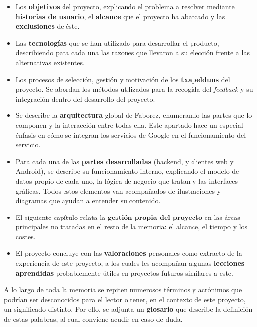 \documentclass[main]{subfiles}
\begin{document}
\begin{itemize}
    \item Los \textbf{objetivos} del proyecto, explicando el problema a resolver mediante \textbf{historias de usuario}, el \textbf{alcance} que el proyecto ha abarcado y las \textbf{exclusiones} de éste.
    
    \item Las \textbf{tecnologías} que se han utilizado para desarrollar el producto, describiendo para cada una las razones que llevaron a su elección frente a las alternativas existentes.
    
    \item Los procesos de selección, gestión y motivación de los \textbf{\glspl{txapeldun}} del proyecto. Se abordan los métodos utilizados para la recogida del \emph{feedback} y su integración dentro del desarrollo del proyecto.
    
    \item Se describe la \textbf{arquitectura} global de Faborez, enumerando las partes que lo componen y la interacción entre todas ella. Este apartado hace un especial énfasis en cómo se integran los servicios de Google en el funcionamiento del servicio.
    
    \item Para cada una de las \textbf{partes desarrolladas} (\gls{backend}, y clientes web y Android), se describe su funcionamiento interno, explicando el modelo de datos propio de cada uno, la lógica de negocio que tratan y las interfaces gráficas. Todos estos elementos van acompañados de ilustraciones y diagramas que ayudan a entender su contenido.
    
    \item El siguiente capítulo relata la \textbf{gestión propia del proyecto} en las áreas principales no tratadas en el resto de la memoria: el alcance, el tiempo y los costes.
    
    \item El proyecto concluye con las \textbf{valoraciones} personales como extracto de la experiencia de este proyecto, a los cuales les acompañan algunas \textbf{lecciones aprendidas} probablemente útiles en proyectos futuros similares a este.
\end{itemize}

A lo largo de toda la memoria se repiten numerosos términos y acrónimos que podrían ser desconocidos para el lector o tener, en el contexto de este proyecto, un significado distinto. Por ello, se adjunta un \textbf{glosario} que describe la definición de estas palabras, al cual conviene acudir en caso de duda.
\end{document}

